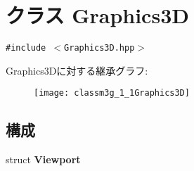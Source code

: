 \hypertarget{classm3g_1_1Graphics3D}{
\section{クラス Graphics3D}
\label{classm3g_1_1Graphics3D}
}
{\tt \#include $<$Graphics3D.hpp$>$}

Graphics3Dに対する継承グラフ:\begin{figure}[H]
\begin{center}
\leavevmode
\texttt{[image: classm3g\_1\_1Graphics3D]}
\end{center}
\end{figure}
\subsection*{構成}
\begin{CompactItemize}
\item 
struct \textbf{Viewport}
\end{CompactItemize}
